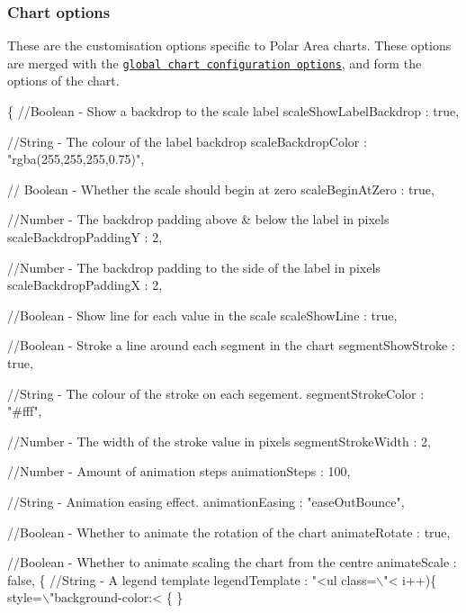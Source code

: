 \subsubsection*{Chart options}

These are the customisation options specific to Polar Area charts. These options are merged with the \href{#getting-started-global-chart-configuration}{\tt global chart configuration options}, and form the options of the chart.


\begin{DoxyCode}
\{
    //Boolean - Show a backdrop to the scale label
    scaleShowLabelBackdrop : true,

    //String - The colour of the label backdrop
    scaleBackdropColor : "rgba(255,255,255,0.75)",

    // Boolean - Whether the scale should begin at zero
    scaleBeginAtZero : true,

    //Number - The backdrop padding above & below the label in pixels
    scaleBackdropPaddingY : 2,

    //Number - The backdrop padding to the side of the label in pixels
    scaleBackdropPaddingX : 2,

    //Boolean - Show line for each value in the scale
    scaleShowLine : true,

    //Boolean - Stroke a line around each segment in the chart
    segmentShowStroke : true,

    //String - The colour of the stroke on each segement.
    segmentStrokeColor : "#fff",

    //Number - The width of the stroke value in pixels
    segmentStrokeWidth : 2,

    //Number - Amount of animation steps
    animationSteps : 100,

    //String - Animation easing effect.
    animationEasing : "easeOutBounce",

    //Boolean - Whether to animate the rotation of the chart
    animateRotate : true,

    //Boolean - Whether to animate scaling the chart from the centre
    animateScale : false,
    \{%
    //String - A legend template
    legendTemplate : "<ul class=\(\backslash\)"<%
       i++)\{%
       style=\(\backslash\)"background-color:<%
    \{%
\}
\end{DoxyCode}


